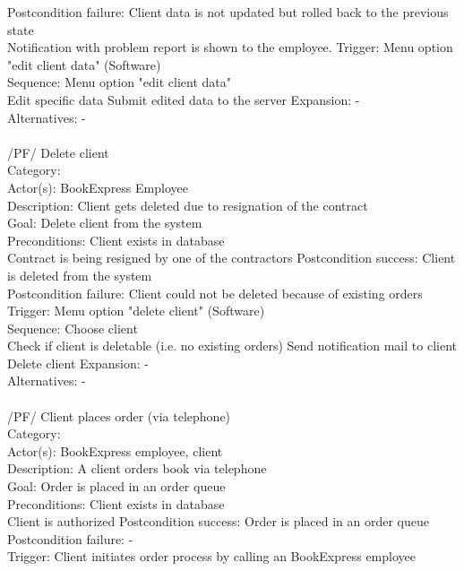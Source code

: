 \documentclass[11pt,a4paper,oneside,svgnames]{report}
\begin{document}
\begin{tabbing}
	 Postcondition failure: \> Client data is not updated but rolled back to the previous state\\
	 \> Notification with problem report is shown to the employee.
	 Trigger: \> Menu option "edit client data" (Software)\\
	 Sequence: \> Menu option "edit client data"\\
	 \> Edit specific data
	 \> Submit edited data to the server
	 Expansion: \> -\\
	 Alternatives: \> -\\
	 \\
	 /PF/ \> Delete client\\ 
	 Category: \> \\
	 Actor(s): \> BookExpress Employee\\ 
	 Description: \> Client gets deleted due to resignation of the contract\\ 
	 Goal: \> Delete client from the system\\
	 Preconditions: \> Client exists in database\\
	 \> Contract is being resigned by one of the contractors
	 Postcondition success: \> Client is deleted from the system\\
	 Postcondition failure: \> Client could not be deleted because of existing orders\\
	 Trigger: \> Menu option "delete client" (Software)\\
	 Sequence: \> Choose client\\
	 \> Check if client is deletable (i.e. no existing orders)
	 \> Send notification mail to client
	 \> Delete client
	 Expansion: \> -\\
	 Alternatives: \> -\\
	 \\
	 /PF/ \> Client places order (via telephone)\\ 
	 Category: \> \\
	 Actor(s): \> BookExpress employee, client\\ 
	 Description: \> A client orders book via telephone\\ 
	 Goal: \> Order is placed in an order queue\\
	 Preconditions: \> Client exists in database\\
	 \> Client is authorized
	 Postcondition success: \> Order is placed in an order queue\\
	 Postcondition failure: \> -\\
	 Trigger: \> Client initiates order process by calling an BookExpress employee\\

\end{tabbing}
\end{document}
